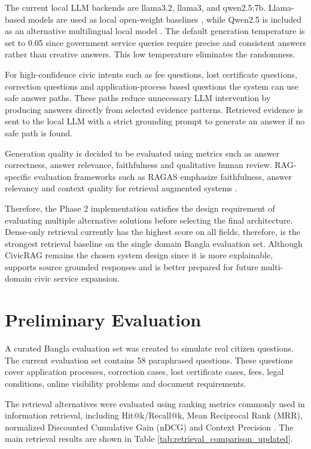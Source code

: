 The current local LLM backends are llama3.2, llama3, and qwen2.5:7b. Llama-based models are used as local open-weight baselines \cite{dubey2024llama3}, while Qwen2.5 is included as an alternative multilingual local model \cite{qwen2025qwen25}. The default generation temperature is set to 0.05 since government service queries require precise and consistent answers rather than creative answers. This low temperature eliminates the randomness.

For high-confidence civic intents such as fee questions, lost certificate questions, correction questions and application-process based questions the system can use safe answer paths. These paths reduce unnecessary LLM intervention by producing answers directly from selected evidence patterns. Retrieved evidence is sent to the local LLM with a strict grounding prompt to generate an answer if no safe path is found.

Generation quality is decided to be evaluated using metrics such as answer correctness, answer relevance, faithfulness and qualitative human review. RAG-specific evaluation frameworks such as RAGAS emphasize faithfulness, answer relevancy and context quality for retrieval augmented systems \cite{es2024ragas}.

Therefore, the Phase 2 implementation satisfies the design requirement of evaluating multiple alternative solutions before selecting the final architecture. Dense-only retrieval currently has the highest score on all fields, therefore, is the strongest retrieval baseline on the single domain Bangla evaluation set. Although CivicRAG remains the chosen system design since it is more explainable, supports source grounded responses and is better prepared for future multi-domain civic service expansion.

\section{Preliminary Evaluation}

A curated Bangla evaluation set was created to simulate real citizen questions. The current evaluation set contains 58 paraphrased questions. These questions cover application processes, correction cases, lost certificate cases, fees, legal conditions, online visibility problems and document requirements.

The retrieval alternatives were evaluated using ranking metrics commonly used in information retrieval, including Hit@k/Recall@k, Mean Reciprocal Rank (MRR), normalized Discounted Cumulative Gain (nDCG) and Context Precision \cite{manning2008ir,voorhees1999trec8qa,jarvelin2002ndcg}. The main retrieval results are shown in Table \ref{tab:retrieval_comparison_updated}.

